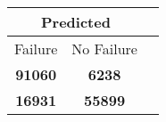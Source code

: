 \begin{tabular} 
 {@{}ccc@{}} 
\toprule 
\multicolumn{2}{c}{\textbf{Predicted}}
 \\ \midrule 
\multicolumn{1}{|c|}{Failure} & 
\multicolumn{1}{c|}{No Failure}
 \\ \midrule 
\multicolumn{1}{|c|}{\color{green}\textbf{91060}} & 
\multicolumn{1}{c|}{\color{red}\textbf{6238}}
 \\ \midrule 
\multicolumn{1}{|c|}{\color{red}\textbf{16931}} & 
\multicolumn{1}{c|}{\color{green}\textbf{55899}}
 \\ \bottomrule 
\end{tabular} 

